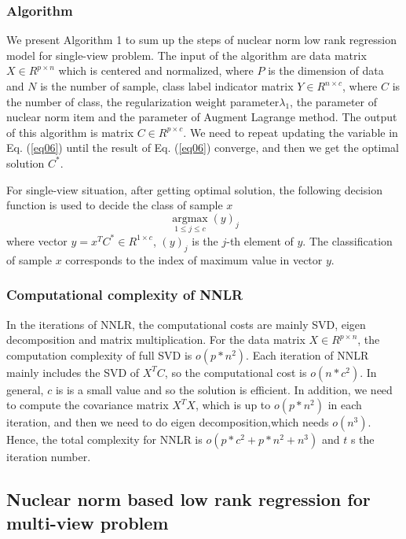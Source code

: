 \documentclass{ieeeaccess}
\begin{document}
\subsubsection{Algorithm}

We present Algorithm 1 to sum up the steps of nuclear norm low rank regression model for single-view problem. The input of the algorithm are data matrix $X \in {R^{p \times n}}$ which is centered and normalized, where $P$ is the dimension of data and $N$ is the number of sample, class label indicator matrix $Y \in {R^{n \times c}}$, where $C$ is the number of class, the regularization weight parameter$\lambda_1$, the parameter of nuclear norm item and the parameter of Augment Lagrange method. The output of this algorithm is matrix $C  \in {R^{p \times c}}$. We need to repeat updating the variable in Eq. (\ref{eq06}) until the result of Eq. (\ref{eq06}) converge, and then we get the optimal solution $C^*$.

For single-view situation, after getting optimal solution, the following decision function is used to decide the class of sample $x$
\begin{equation}\label{eq16}
\mathop {\arg \max }\limits_{1 \le j \le c} {(y)_j}
\end{equation}
where vector $y = {x^T}{C ^*} \in {R^{1 \times c}}$, ${(y)_j}$ is the $j$-th element of $y$. The classification of sample $x$ corresponds to the index of maximum value in vector $y$.

\subsubsection{Computational complexity of NNLR}

In the iterations of NNLR, the computational costs are mainly SVD, eigen decomposition and matrix multiplication. For the data matrix $X \in {R^{p \times n}}$, the computation complexity of full SVD is $o(p*{n^2})$. Each iteration of NNLR mainly includes the SVD of ${X^T}C$, so the computational cost is $o(n*{c^2})$. In general, $c$ is is a small value and so the solution is efficient.  In addition, we need to compute the covariance matrix ${X^T}X$, which is up to $o(p*{n^2})$ in each iteration, and then we need to do eigen decomposition,which needs $o({n^3})$. Hence, the total complexity for NNLR is $o(p*{c^2} + p*{n^2} + {n^3})$ and $t$ s the iteration number.



\subsection{Nuclear norm based low rank regression for multi-view problem}
\end{document}
